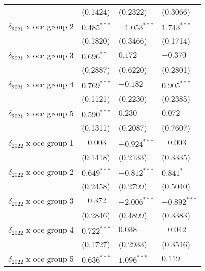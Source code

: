 \begin{tabular}{llll}
                                         &           (0.1424) &           (0.2322) &           (0.3066) \\
$\delta_{2021}$ x occ group 2            &      $0.485^{***}$ &     $-1.053^{***}$ &      $1.743^{***}$ \\
                                         &           (0.1820) &           (0.3466) &           (0.1714) \\
$\delta_{2021}$ x occ group 3            &       $0.696^{**}$ &            $0.172$ &           $-0.370$ \\
                                         &           (0.2887) &           (0.6220) &           (0.2801) \\
$\delta_{2021}$ x occ group 4            &      $0.769^{***}$ &           $-0.182$ &      $0.905^{***}$ \\
                                         &           (0.1121) &           (0.2230) &           (0.2385) \\
$\delta_{2021}$ x occ group 5            &      $0.590^{***}$ &            $0.230$ &            $0.072$ \\
                                         &           (0.1311) &           (0.2087) &           (0.7607) \\
$\delta_{2022}$ x occ group 1            &           $-0.003$ &     $-0.924^{***}$ &           $-0.003$ \\
                                         &           (0.1418) &           (0.2133) &           (0.3335) \\
$\delta_{2022}$ x occ group 2            &      $0.649^{***}$ &     $-0.812^{***}$ &          $0.841^*$ \\
                                         &           (0.2458) &           (0.2799) &           (0.5040) \\
$\delta_{2022}$ x occ group 3            &           $-0.372$ &     $-2.006^{***}$ &     $-0.892^{***}$ \\
                                         &           (0.2846) &           (0.4899) &           (0.3383) \\
$\delta_{2022}$ x occ group 4            &      $0.722^{***}$ &            $0.038$ &           $-0.042$ \\
                                         &           (0.1727) &           (0.2933) &           (0.3516) \\
$\delta_{2022}$ x occ group 5            &      $0.636^{***}$ &      $1.096^{***}$ &            $0.119$ \\

\end{tabular}
